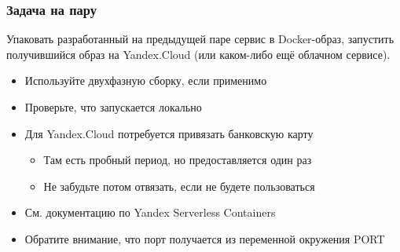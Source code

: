 \documentclass{../../slides-style}
\begin{document}
    
    \begin{frame}[plain]
        \titlepage
    \end{frame}

    \begin{frame}
        \frametitle{Задача на пару}
        Упаковать разработанный на предыдущей паре сервис в Docker-образ, запустить получившийся образ на Yandex.Cloud (или каком-либо ещё облачном сервисе).
        \begin{itemize}
            \item Используйте двухфазную сборку, если применимо
            \item Проверьте, что запускается локально
            \item Для Yandex.Cloud потребуется привязать банковскую карту
            \begin{itemize}
                \item Там есть пробный период, но предоставляется один раз
                \item Не забудьте потом отвязать, если не будете пользоваться
            \end{itemize}
            \item См. документацию по Yandex Serverless Containers
            \item Обратите внимание, что порт получается из переменной окружения PORT
        \end{itemize}
    \end{frame}
\end{document}
